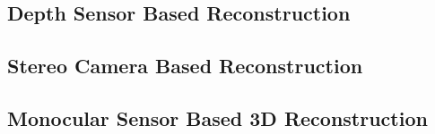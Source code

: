 
\subsection{Depth Sensor Based Reconstruction}



\subsection{Stereo Camera Based Reconstruction}

\subsection{Monocular Sensor Based 3D Reconstruction}